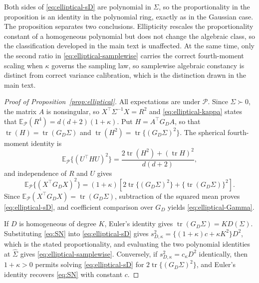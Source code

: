 \documentclass[12pt,a4paper]{article}
\theoremstyle{plain}
\theoremstyle{definition}
\newcommand{\E}{\mathbb{E}}
\newcommand{\tr}{\operatorname{tr}}
\newcommand{\Sighat}{\hat{\Sigma}}
\begin{document}
Both sides of \eqref{eq:elliptical-sD} are polynomial in $\Sigma$, so the proportionality in the proposition is an identity in the polynomial ring, exactly as in the Gaussian case.
The proposition separates two conclusions.
Ellipticity rescales the proportionality constant of a homogeneous polynomial but does not change the algebraic class, so the classification developed in the main text is unaffected.
At the same time, only the second ratio in \eqref{eq:elliptical-samplewise} carries the correct fourth-moment scaling when $\kappa$ governs the sampling law, so samplewise algebraic constancy is distinct from correct variance calibration, which is the distinction drawn in the main text.

\begin{proof}[Proof of Proposition~\ref{prop:elliptical}]
    All expectations are under $\mathcal{P}$.
    Since $\Sigma\succ0$, the matrix $A$ is nonsingular, so $X^\top\Sigma^{-1}X=R^2$ and \eqref{eq:elliptical-kappa} states that $\E_{\mathcal{P}}(R^4)=d(d+2)(1+\kappa)$.
    Put $H=A^\top G_DA$, so that $\tr(H)=\tr(G_D\Sigma)$ and $\tr(H^2)=\tr\{(G_D\Sigma)^2\}$.
    The spherical fourth-moment identity is
    \begin{equation*}
        \E_{\mathcal{P}}\{(U^\top HU)^2\}
        =
        \frac{2\tr(H^2)+(\tr H)^2}{d(d+2)}
        ,
    \end{equation*}
    and independence of $R$ and $U$ gives
    \begin{equation*}
        \E_{\mathcal{P}}\{(X^\top G_DX)^2\}
        =
        (1+\kappa)
        [2\tr\{(G_D\Sigma)^2\}+\{\tr(G_D\Sigma)\}^2]
        .
    \end{equation*}
    Since $\E_{\mathcal{P}}(X^\top G_DX)=\tr(G_D\Sigma)$, subtraction of the squared mean proves \eqref{eq:elliptical-sD}, and coefficient comparison over $G_D$ yields \eqref{eq:elliptical-Gamma}.
    
    If $D$ is homogeneous of degree $K$, Euler's identity gives $\tr(G_D\Sigma)=KD(\Sigma)$.
    Substituting \eqref{eq:SN} into \eqref{eq:elliptical-sD} gives $s_{D,\kappa}^2=\{(1+\kappa)c+\kappa K^2\}D^2$, which is the stated proportionality, and evaluating the two polynomial identities at $\Sighat$ gives \eqref{eq:elliptical-samplewise}.
    Conversely, if $s_{D,\kappa}^2=c_\kappa D^2$ identically, then $1+\kappa>0$ permits solving \eqref{eq:elliptical-sD} for $2\tr\{(G_D\Sigma)^2\}$, and Euler's identity recovers \eqref{eq:SN} with constant $c$.
\end{proof}
\end{document}
